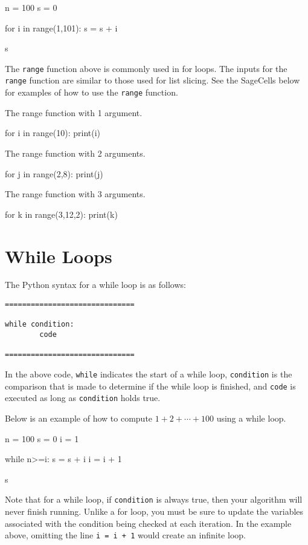 \documentclass{ximera}
\begin{document}
\begin{sageCell}
n = 100
s = 0

for i in range(1,101):
        s = s + i

s
\end{sageCell}

The \verb|range| function above is commonly used in for loops. The inputs for the \verb|range| function are similar to those used for list slicing. See the SageCells below for examples of how to use the \verb|range| function.

The range function with 1 argument.
\begin{sageCell}
for i in range(10):
     print(i)
\end{sageCell}

The range function with 2 arguments.
\begin{sageCell}
for j in range(2,8):
     print(j)
\end{sageCell}

The range function with 3 arguments.
\begin{sageCell}
for k in range(3,12,2):
     print(k)
\end{sageCell}

\section{While Loops}

The Python syntax for a while loop is as follows:

\begin{verbatim}
==============================

while condition:
        code

==============================
\end{verbatim}

In the above code, \verb|while| indicates the start of a while loop, \verb|condition| is the comparison that is made to determine if the while loop is finished, and \verb|code| is executed as long as \verb|condition| holds true.

Below is an example of how to compute $1+2+\cdots+100$ using a while loop.

\begin{sageCell}
n = 100
s = 0
i = 1

while n>=i:
        s = s + i
	i = i + 1

s
\end{sageCell}

Note that for a while loop, if \verb|condition| is always true, then your algorithm will never finish running. Unlike a for loop, you must be sure to update the variables associated with the condition being checked at each iteration. In the example above, omitting the line \verb|i = i + 1| would create an infinite loop.
\end{document}
